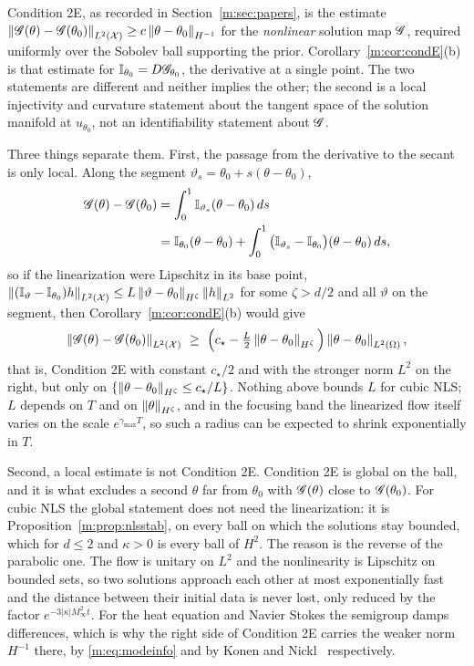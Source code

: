 \begin{remark}\label{m:rem:condEgap}
Condition 2E, as recorded in Section~\ref{m:sec:papers}, is the estimate $\left\|\mathscr{G}(\theta)-\mathscr{G}(\theta_0)\right\|_{L^2(\mathcal X)}\ge c\left\|\theta-\theta_0\right\|_{H^{-1}}$ for the \emph{nonlinear} solution map $\mathscr{G}$, required uniformly over the Sobolev ball supporting the prior. Corollary~\ref{m:cor:condE}(b) is that estimate for $\mathbb{I}_{\theta_0}=D\mathscr{G}_{\theta_0}$, the derivative at a single point. The two statements are different and neither implies the other; the second is a local injectivity and curvature statement about the tangent space of the solution manifold at $u_{\theta_0}$, not an identifiability statement about $\mathscr{G}$.

Three things separate them. First, the passage from the derivative to the secant is only local. Along the segment $\vartheta_s=\theta_0+s(\theta-\theta_0)$,
\[
\begin{aligned}
\mathscr{G}(\theta)-\mathscr{G}(\theta_0)&=\int_0^1\mathbb{I}_{\vartheta_s}(\theta-\theta_0)\,ds\\
&=\mathbb{I}_{\theta_0}(\theta-\theta_0)+\int_0^1\big(\mathbb{I}_{\vartheta_s}-\mathbb{I}_{\theta_0}\big)(\theta-\theta_0)\,ds ,
\end{aligned}
\]
so if the linearization were Lipschitz in its base point, $\left\|(\mathbb{I}_\vartheta-\mathbb{I}_{\theta_0})h\right\|_{L^2(\mathcal X)}\le L\left\|\vartheta-\theta_0\right\|_{H^\zeta}\left\|h\right\|_{L^2}$ for some $\zeta>d/2$ and all $\vartheta$ on the segment, then Corollary~\ref{m:cor:condE}(b) would give
\[
\left\|\mathscr{G}(\theta)-\mathscr{G}(\theta_0)\right\|_{L^2(\mathcal X)}\ \ge\ \Big(c_\star-\tfrac L2\left\|\theta-\theta_0\right\|_{H^\zeta}\Big)\left\|\theta-\theta_0\right\|_{L^2(\Omega)} ,
\]
that is, Condition 2E with constant $c_\star/2$ and with the stronger norm $L^2$ on the right, but only on $\{\left\|\theta-\theta_0\right\|_{H^\zeta}\le c_\star/L\}$. Nothing above bounds $L$ for cubic NLS; $L$ depends on $T$ and on $\left\|\theta\right\|_{H^\zeta}$, and in the focusing band the linearized flow itself varies on the scale $e^{\gamma_{\max}T}$, so such a radius can be expected to shrink exponentially in $T$.

Second, a local estimate is not Condition 2E. Condition 2E is global on the ball, and it is what excludes a second $\theta$ far from $\theta_0$ with $\mathscr{G}(\theta)$ close to $\mathscr{G}(\theta_0)$. For cubic NLS the global statement does not need the linearization: it is Proposition~\ref{m:prop:nlsstab}, on every ball on which the solutions stay bounded, which for $d\le2$ and $\kappa>0$ is every ball of $H^2$. The reason is the reverse of the parabolic one. The flow is unitary on $L^2$ and the nonlinearity is Lipschitz on bounded sets, so two solutions approach each other at most exponentially fast and the distance between their initial data is never lost, only reduced by the factor $e^{-3|\kappa|M_\infty^2t}$. For the heat equation and Navier Stokes the semigroup damps differences, which is why the right side of Condition 2E carries the weaker norm $H^{-1}$ there, by \eqref{m:eq:modeinfo} and by Konen and Nickl~\cite{konennickl2026} respectively.


\end{remark}
